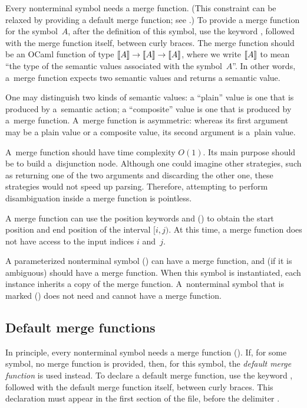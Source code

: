 Every nonterminal symbol needs a merge function.
(This constraint can be relaxed
by providing a default merge function; see .)
To provide a merge function for the symbol~$A$,
after the definition of this symbol,
use the keyword \dmerge,
followed with the merge function itself,
between curly braces.
The merge function should be an OCaml function
of type $\llbracket A\rrbracket \rightarrow \llbracket A\rrbracket \rightarrow \llbracket A\rrbracket$,
where we write $\llbracket A\rrbracket$
to mean ``the type of the semantic values associated with the symbol~$A$''.
%
In other words, a~merge function expects two semantic values
and returns a semantic value.

One may distinguish two kinds of semantic values:
a ``plain'' value is one that is produced by a~semantic action;
a ``composite'' value is one that is produced by a~merge function.
A~merge function is asymmetric:
whereas its first argument may be a plain value or a composite value,
its second argument
is a~plain value.

A~merge function should have time complexity $O(1)$.
Its main purpose should be to build a~disjunction node.
Although one could imagine other strategies,
such as returning one of the two arguments
and discarding the other one,
these strategies would not speed up parsing.
Therefore, attempting to perform disambiguation
inside a merge function is pointless.

A merge function can use the position keywords
\kstartpos and \kendpos ()
to obtain the start position and end position
of the interval $[i, j)$.
%
At this time, a merge function
does not have access to the input indices $i$ and~$j$.

A parameterized nonterminal symbol () can have a merge
function, and (if it is ambiguous) should have a merge function. When this
symbol is instantiated, each instance inherits a copy of the merge function.
%
A~nonterminal symbol that is marked \dinline () does not
need and cannot have a merge function.


\subsection{Default merge functions}
\label{sec:GLR:default:merge}

In principle, every nonterminal symbol needs a merge function
().
%
If, for some symbol, no merge function is provided,
then, for this symbol, the \emph{default merge function} is used instead.
%
To declare a default merge function,
use the keyword \dmerge,
followed with the default merge function itself,
between curly braces.
%
This declaration must appear in the first section of the \mly file,
before the delimiter \percentpercent.
%

